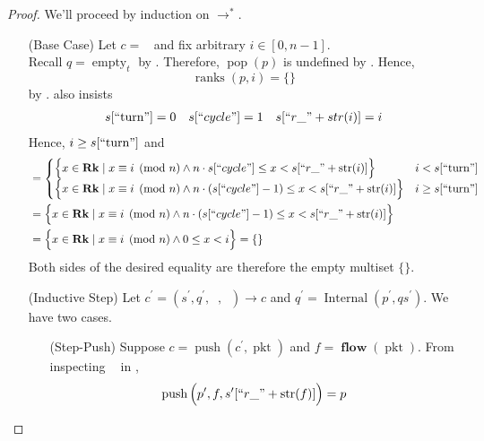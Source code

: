 \documentclass{amsart}
\DeclareMathOperator{\pkt}{\mathrm{pkt}}
\DeclareMathOperator{\push}{\mathrm{push}}
\DeclareMathOperator{\pop}{\mathrm{pop}}
\DeclareMathOperator{\Rk}{\mathbf{Rk}}
\DeclareMathOperator{\Internal}{\mathrm{Internal}}
\DeclareMathOperator{\flow}{\mathbf{flow}}
\DeclareMathOperator{\zprepush}{z_{\mathrm{pre-push}}}
\DeclareMathOperator{\zpostpop}{z_{\mathrm{post-pop}}}
\DeclareMathOperator{\crr}{c_{\text{RR}}}
\DeclareMathOperator{\emt}{\mathrm{empty}}
\DeclareMathOperator{\ranks}{\mathrm{ranks}}
\theoremstyle{definition}
\begin{document}
\lemranks*

\begin{proof}
    We'll proceed by induction on $\to^\ast$.
    \begin{enumerate}
        \item[(Base Case)] Let $c = \crr$ and fix arbitrary $i \in [0, n - 1]$.\\
            Recall $q = \emt_t$ by . 
            Therefore, $\pop(p)$ is undefined by .
            Hence, $$\ranks(p, i) = \{\}$$ by .
             also insists
            \begin{align*}
                s[``\text{turn}"] = 0
                &&
                s[``cycle"] = 1
                &&
                s[``r\_" + str(i)] = i
            \end{align*}
            Hence, $i \geq s[``\text{turn}"]$ and
            \begin{align*}
                &=
                \begin{cases}
                    \Big\{x \in \Rk \mid x \equiv i \pmod n \land n \cdot s[``cycle"] \leq x < s[``r\_" + \mathrm{str}(i)] \Big\} 
                    & i < s[``\text{turn}"]\\
                    \Big\{x \in \Rk \mid x \equiv i \pmod n \land n \cdot (s[``cycle"] - 1) \leq x < s[``r\_" + \mathrm{str}(i)]\Big\} 
                    & i \geq s[``\text{turn}"]
                \end{cases}\\
                &= \Big\{x \in \Rk \mid x \equiv i \pmod n \land n \cdot (s[``cycle"] - 1) \leq x < s[``r\_" + \mathrm{str}(i)]\Big\}\\
                &= \Big\{x \in \Rk \mid x \equiv i \pmod n \land 0 \leq x < i \Big\} = \{\}
            \end{align*}
            Both sides of the desired equality are therefore the empty multiset $\{\}$.
        \item[(Inductive Step)] Let $c^\prime = (s^\prime, q^\prime, \zprepush, \zpostpop) \to c$ and $q^\prime = \Internal(p^\prime, qs^\prime)$.
            We have two cases.
            \begin{enumerate}
                \item[(Step-Push)] Suppose $c = \push(c^\prime, \pkt)$ and $f = \flow(\pkt)$.
                    From inspecting $\zprepush$ in ,
                    \begin{align*}
                        \push\Big(p^\prime, f, s^\prime[``r\_" + \mathrm{str}(f)]\Big) = p

\end{align*}
\end{enumerate}
\end{enumerate}
\end{proof}
\end{document}
